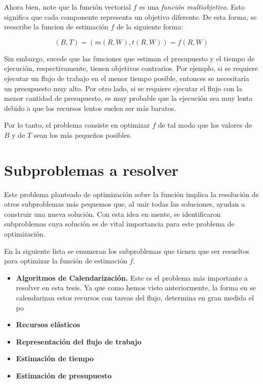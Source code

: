 \documentclass[letterpaper, 12pt]{report}
\begin{document}
Ahora bien, note que la función vectorial $f$ es una \emph{función multiobjetivo}. Esto significa que cada componente representa un objetivo diferente. De esta forma, se reescribe la funcion de estimación $f$ de la siguiente forma:

\begin{equation}
(B,T) = (m(R,W), t(R,W)) = f(R,W)
\end{equation}

Sin embargo, sucede que las funciones que estiman el presupuesto y el tiempo de ejecución, respectivamente, tienen objetivos contrarios. Por ejemplo, si se requiere ejecutar un flujo de trabajo en el menor tiempo posible, entonces se necesitaría un presupuesto muy alto. Por otro lado, si se requiere ejecutar el flujo con la menor cantidad de presupuesto, es muy probable que la ejecución sea muy lenta debido a que los recursos lentos suelen ser más baratos.

Por lo tanto, el problema consiste en optimizar $f$ de tal modo que los valores de $B$ y de $T$ sean los más pequeños posibles.

\section*{Subproblemas a resolver}
Este problema planteado de optimización sobre la función implica la resolución de otros subproblemas más pequemos que, al unir todas las soluciones, ayudan a construir una nueva solución. Con esta idea en mente, se identificaron subproblemas cuya solución es de vital importancia para este problema de optimización.

En la siguiente lista se enumeran los subproblemas que tienen que ser resueltos para optimizar la función de estimación $f$.

\begin{itemize}
\item \textbf{Algoritmos de Calendarización.} Este es el problema más importante a resolver en esta tesis. Ya que como hemos visto anteriormente, la forma en se calendarizan estos recursos con tareas del flujo, determina en gran medida el po

\item \textbf{Recursos elásticos}
\item \textbf{Representación del flujo de trabajo}
\item \textbf{Estimación de tiempo}
\item \textbf{Estimación de presupuesto}
\end{itemize}
\end{document}
